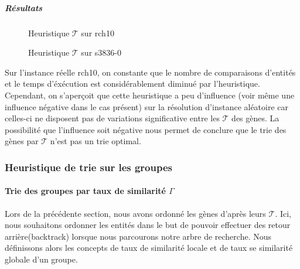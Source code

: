 \subparagraph{Résultats}

\begin{figure}[H]
\centering
	\begin{minipage}[c]{0.49\linewidth}
	\centering
	
	\end{minipage}
	\begin{minipage}[c]{0.49\linewidth}
	\centering
	
	\end{minipage}
\caption{Heuristique $\mathcal{T}$ sur rch10}
\end{figure}

\begin{figure}[H]
\centering
	\begin{minipage}[c]{0.49\linewidth}
	\centering
	
	\end{minipage}
	\begin{minipage}[c]{0.49\linewidth}
	\centering
	
	\end{minipage}
\caption{Heuristique $\mathcal{T}$ sur s3836-0}
\end{figure}

Sur l'instance réelle rch10, on constante que le nombre de comparaisons d'entités  et le temps d'éxécution est considérablement diminué par l'heuristique. Cependant, on s'aperçoit que cette heuristique a peu d'influence (voir même une influence négative dans le cas présent) sur la résolution d'instance aléatoire car celles-ci ne disposent pas de variations significative entre les $\mathcal{T}$ des gènes. La possibilité que l'influence soit négative nous permet de conclure que le trie des gènes par $\mathcal{T}$ n'est pas un trie optimal. 


\subsubsection{Heuristique de trie sur les groupes}
\paragraph{Trie des groupes par taux de similarité $\Gamma$}
Lors de la précédente section, nous avons ordonné les gènes d'après leurs $\mathcal{T}$. Ici, nous souhaitons ordonner les entités dans le but de pouvoir effectuer des retour arrière(backtrack) lorsque nous parcourons notre arbre de recherche. Nous définissons alors les concepts de taux de similarité locale et de taux se similarité globale d'un groupe.

